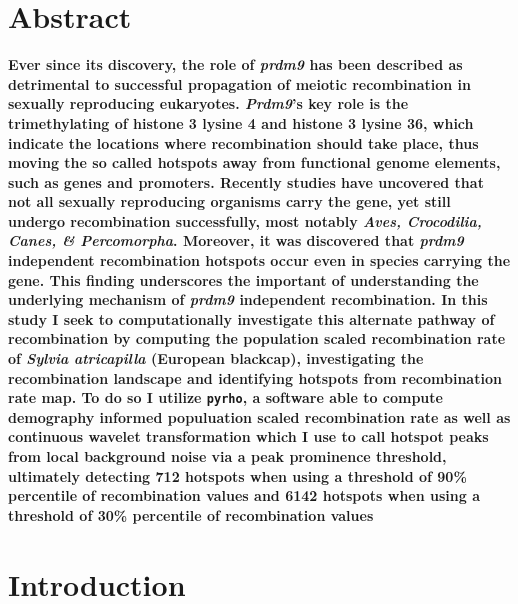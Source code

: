 \documentclass[12pt,a4paper]{article}
\begin{document}
\section{Abstract}
\textbf{Ever since its discovery, the role of \textit{prdm9} has been described as detrimental to
	successful propagation of meiotic recombination in sexually reproducing eukaryotes. \textit{Prdm9}'s
	key role is the trimethylating of histone 3 lysine 4 and histone 3 lysine 36, which indicate the
	locations where recombination should take place, thus moving the so called hotspots away from functional genome elements,
	such as genes and promoters. Recently studies have uncovered that not all sexually
	reproducing organisms carry the gene, yet still undergo recombination successfully, most notably \textit{Aves, Crocodilia, Canes, \& Percomorpha}.
	Moreover, it was discovered that \textit{prdm9} independent recombination hotspots occur even in
	species carrying the gene. This finding underscores the important of understanding the underlying
	mechanism of \textit{prdm9} independent recombination. In this study I seek to computationally investigate this
	alternate pathway of recombination by computing the population scaled recombination rate of
	\textit{Sylvia atricapilla} (European blackcap), investigating the recombination landscape and identifying hotspots from recombination rate map.
	To do so I utilize \texttt{pyrho}, a software able to compute demography informed populuation scaled
	recombination rate as well as continuous wavelet transformation which I use to call hotspot peaks
	from local background noise via a peak prominence threshold, ultimately detecting 712 hotspots when
	using a threshold of 90\% percentile of recombination values and 6142 hotspots when using a
	threshold of 30\% percentile of recombination values}

\section{Introduction}
\end{document}
